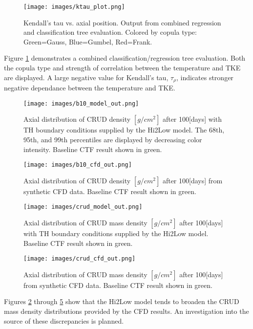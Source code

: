 \begin{figure}[hbtp]
\centering
\texttt{[image: images/ktau\_plot.png]}
\caption{Kendall's tau vs. axial position. Output from combined regression and classification tree evaluation. Colored by copula type: Green=Gauss, Blue=Gumbel, Red=Frank.}
\label{fig:ktau_plot}
\end{figure}

Figure \ref{fig:ktau_plot} demonstrates a combined classification/regression tree evaluation.  Both the copula type and strength of correlation between the temperature and TKE are displayed.  A large negative value for Kendall's tau, $\tau_\rho$, indicates stronger negative dependance between the temperature and TKE. 

\begin{figure}[hbtp]
\centering
\texttt{[image: images/b10\_model\_out.png]}
\caption{Axial distribution of CRUD  density $[g/cm^2]$ after 100[days] with TH boundary conditions supplied by the Hi2Low model. The 68th, 95th, and 99th percentiles are displayed by decreasing color intensity. Baseline CTF result shown in green.}
\label{fig:b10_model_out}
\end{figure}

\begin{figure}[hbtp]
\centering
\texttt{[image: images/b10\_cfd\_out.png]}
\caption{Axial distribution of CRUD  density $[g/cm^2]$ after 100[days] from synthetic CFD data. Baseline CTF result shown in green.}
\label{fig:b10_cfd_out}
\end{figure}

\begin{figure}[hbtp]
\centering
\texttt{[image: images/crud\_model\_out.png]}
\caption{Axial distribution of CRUD mass density $[g/cm^2]$ after 100[days] with TH boundary conditions supplied by the Hi2Low model. Baseline CTF result shown in green.}
\label{fig:crud_model_out}
\end{figure}

\begin{figure}[hbtp]
\centering
\texttt{[image: images/crud\_cfd\_out.png]}
\caption{Axial distribution of CRUD mass density $[g/cm^2]$ after 100[days] from synthetic CFD data. Baseline CTF result shown in green.}
\label{fig:crud_cfd_out}
\end{figure}

Figures \ref{fig:b10_model_out} through \ref{fig:crud_cfd_out} show that the Hi2Low model tends to broaden the CRUD mass density distributions provided by the CFD results.  An investigation into the source of these discrepancies is planned.  

